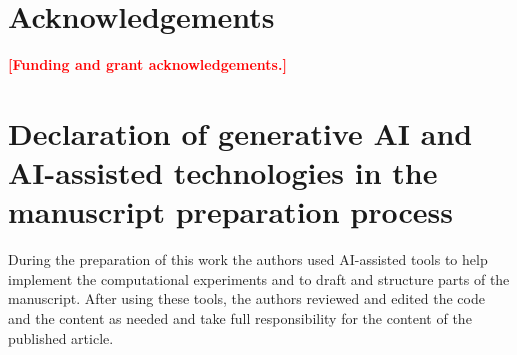 \documentclass[a4paper,fleqn]{cas-dc}
\newcommand{\todo}[1]{\textcolor{red}{\textbf{[#1]}}}
\begin{document}
\section*{Acknowledgements}
\todo{Funding and grant acknowledgements.}

\section*{Declaration of generative AI and AI-assisted technologies in the manuscript preparation process}
During the preparation of this work the authors used AI-assisted tools to help implement the computational experiments and to draft and structure parts of the manuscript. After using these tools, the authors reviewed and edited the code and the content as needed and take full responsibility for the content of the published article.

\appendix




\end{document}
